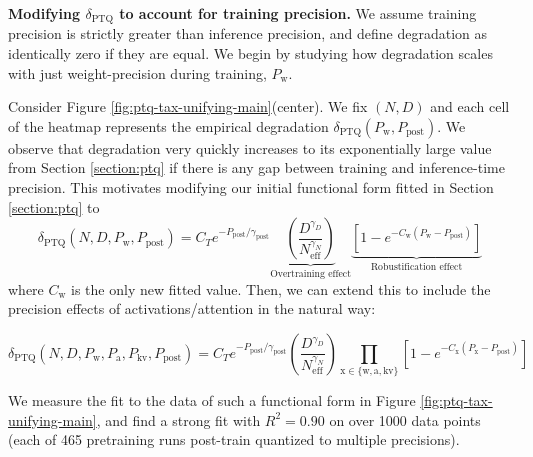 \documentclass[11pt]{article}
\begin{document}
\textbf{Modifying $\delta_\text{PTQ}$ to account for training precision.} We assume training precision is strictly greater than inference precision, and define degradation as identically zero if they are equal. We begin by studying how degradation scales with just weight-precision during training, $P_\text{w}$. 

Consider Figure \ref{fig:ptq-tax-unifying-main}(center). We fix $(N,D)$ and each cell of the heatmap represents the empirical degradation $\delta_\text{PTQ}(P_\text{w}, P_\text{post})$. We observe that degradation very quickly increases to its exponentially large value from Section \ref{section:ptq} if there is any gap between training and inference-time precision. This motivates modifying our initial functional form fitted in Section \ref{section:ptq} to 
%
\begin{equation}\label{eqn:final-ptqw}
    \delta_\text{PTQ}(N, D, P_\text{w}, P_\text{post}) = 
    C_T e^{-P_\text{post}/\gamma_\text{post}} 
    \underbrace{\left(\frac{D^{\gamma_D}}{N_\text{eff}^{\gamma_N}}\right)}_{\text{Overtraining effect}}
    \underbrace{[1 - e^{-C_\text{w}(P_\text{w} - P_\text{post})}]}_{\text{Robustification effect}}
\end{equation}
%
where $C_\text{w}$ is the only new fitted value. Then, we can extend this to include the precision effects of activations/attention in the natural way:

\begin{equation}
    \label{eqn:final-ptq}
    \delta_\text{PTQ}(N, D, P_\text{w},P_\text{a},P_\text{kv}, P_\text{post}) = 
    C_T e^{-P_\text{post}/\gamma_\text{post}} 
    \left(\frac{D^{\gamma_D}}{N_\text{eff}^{\gamma_N}}\right)
    \prod_{\text{x} \in \{\text{w}, \text{a}, \text{kv}\}} [1 - e^{-C_\text{x}(P_\text{x} - P_\text{post})}]
\end{equation}

We measure the fit to the data of such a functional form in Figure \ref{fig:ptq-tax-unifying-main}, and find a strong fit with $R^2 = 0.90$ on over 1000 data points (each of 465 pretraining runs post-train quantized to multiple precisions). 
\end{document}

